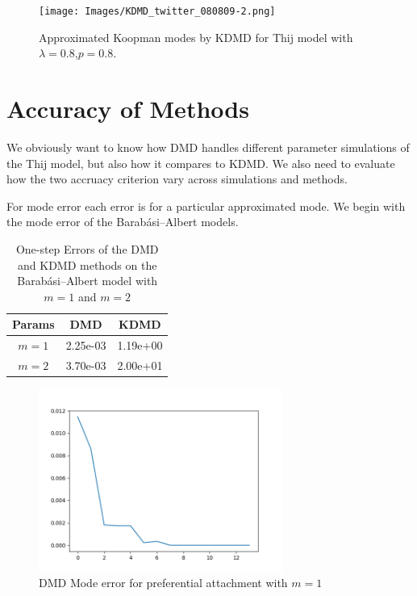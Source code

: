 \begin{figure}
    \texttt{[image: Images/KDMD\_twitter\_080809-2.png]}
    \centering
    \caption{Approximated Koopman modes by KDMD for Thij model
    with $\lambda=0.8$,$p=0.8$.}
\end{figure}

\FloatBarrier


\section{Accuracy of Methods}

We obviously want to know how DMD handles different parameter simulations of the Thij model,
but also how it compares to KDMD. We also need to evaluate how the two accruacy criterion vary across
simulations and methods. 

For mode error each error is for a particular approximated mode. We begin with the mode error of the 
Barabási–Albert models.

\begin{table}
    \centering
    \begin{tabular}{||c c c ||} 
    \hline
    Params & DMD & KDMD  \\ [0.5ex] 
    \hline\hline
    $m=1$ & 2.25e-03 &  1.19e+00\\ 
    \hline
    $m=2$ & 3.70e-03 & 2.00e+01 \\
    \hline
   \end{tabular}
   \caption{One-step Errors of the DMD and KDMD methods on the Barabási–Albert model with $m=1$ and $m=2$}
   \label{table:15}
\end{table}

\begin{figure}
    \includegraphics[width=8cm]{Images/mode_error_dmd_prefattach1.png}
    \centering
    \caption{DMD Mode error for preferential attachment with $m=1$}
\end{figure}

